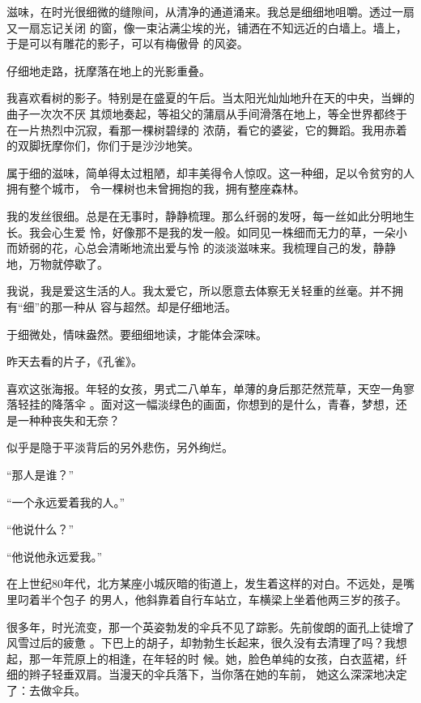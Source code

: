\documentclass[12pt,a4paper]{article}
\begin{document}
		滋味，在时光很细微的缝隙间，从清净的通道涌来。我总是细细地咀嚼。透过一扇又一扇忘记关闭
	的窗，像一束沾满尘埃的光，铺洒在不知远近的白墙上。墙上，于是可以有雕花的影子，可以有梅傲骨
	的风姿。

		仔细地走路，抚摩落在地上的光影重叠。

		我喜欢看树的影子。特别是在盛夏的午后。当太阳光灿灿地升在天的中央，当蝉的曲子一次次不厌
	其烦地奏起，等祖父的蒲扇从手间滑落在地上，等全世界都终于在一片热烈中沉寂，看那一棵树碧绿的
	浓荫，看它的婆娑，它的舞蹈。我用赤着的双脚抚摩你们，你们于是沙沙地笑。

		属于细的滋味，简单得太过粗陋，却丰美得令人惊叹。这一种细，足以令贫穷的人拥有整个城市，
	令一棵树也未曾拥抱的我，拥有整座森林。

		我的发丝很细。总是在无事时，静静梳理。那么纤弱的发呀，每一丝如此分明地生长。我会心生爱
	怜，好像那不是我的发一般。如同见一株细而无力的草，一朵小而娇弱的花，心总会清晰地流出爱与怜
	的淡淡滋味来。我梳理自己的发，静静地，万物就停歇了。

		我说，我是爱这生活的人。我太爱它，所以愿意去体察无关轻重的丝毫。并不拥有“细”的那一种从
	容与超然。却是仔细地活。

		于细微处，情味盎然。要细细地读，才能体会深味。

	\endwriting



		昨天去看的片子，《孔雀》。

		喜欢这张海报。年轻的女孩，男式二八单车，单薄的身后那茫然荒草，天空一角寥落轻挂的降落伞
	。面对这一幅淡绿色的画面，你想到的是什么，青春，梦想，还是一种种丧失和无奈？

		似乎是隐于平淡背后的另外悲伤，另外绚烂。

	\endwriting



		“那人是谁？” \par
		“一个永远爱着我的人。” \par
		“他说什么？” \par
		“他说他永远爱我。”

		在上世纪80年代，北方某座小城灰暗的街道上，发生着这样的对白。不远处，是嘴里叼着半个包子
	的男人，他斜靠着自行车站立，车横梁上坐着他两三岁的孩子。

		很多年，时光流变，那一个英姿勃发的伞兵不见了踪影。先前俊朗的面孔上徒增了风雪过后的疲惫
	。下巴上的胡子，却勃勃生长起来，很久没有去清理了吗？我想起，那一年荒原上的相逢，在年轻的时
	候。她，脸色单纯的女孩，白衣蓝裙，纤细的辫子轻垂双肩。当漫天的伞兵落下，当你落在她的车前，
	她这么深深地决定了：去做伞兵。
\end{document}
